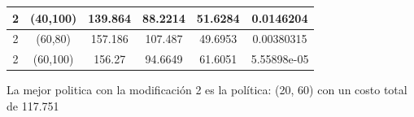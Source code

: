 \documentclass[12pt, spanish]{article}
\begin{document}
\begin{table}[H]
{\begin{tabular}{|c|c|c|c|c|c|}
2                     & (40,100)          & 139.864              & 88.2214                  & 51.6284                         & 0.0146204                 \\ \hline
2                     & (60,80)           & 157.186              & 107.487                  & 49.6953                         & 0.00380315                \\ \hline
2                     & (60,100)          & 156.27               & 94.6649                  & 61.6051                         & 5.55898e-05               \\ \hline
\end{tabular}
}
\end{table}

La mejor politica con la modificación 2 es la política: (20, 60) con un costo total de 117.751








%
%
\end{document}
